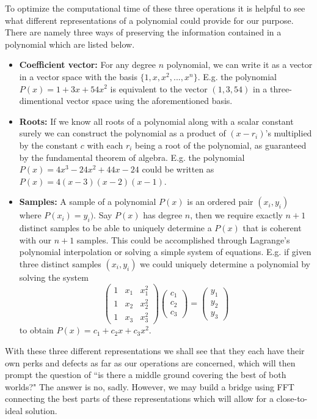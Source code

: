 \documentclass[12pt]{article}
\begin{document}
To optimize the computational time of these three operations it is helpful to see what different representations of a polynomial could provide for our purpose. There are namely three ways of preserving the information contained in a polynomial which are listed below.

\begin{itemize}
\item{\textbf{Coefficient vector:}} For any degree $n$ polynomial, we can write it as a vector in a vector space with the basis $\{1, x, x^2, ..., x^n\}$. E.g. the polynomial $P(x) = 1+3x+54x^2$ is equivalent to the vector $(1,3,54)$ in a three-dimentional vector space using the aforementioned basis.
\item{\textbf{Roots:}} If we know all roots of a polynomial along with a scalar constant surely we can construct the polynomial as a product of $(x-r_i)$'s multiplied by the constant $c$ with each $r_i$ being a root of the polynomial, as guaranteed by the fundamental theorem of algebra. E.g. the polynomial $P(x) = 4x^3-24x^2+44x-24$ could be written as $P(x) = 4(x-3)(x-2)(x-1)$.
\item{\textbf{Samples:}} A sample of a polynomial $P(x)$ is an ordered pair $(x_i,y_i)$ where $P(x_i) = y_i)$. Say $P(x)$ has degree $n$, then we require exactly $n+1$ distinct samples to be able to uniquely determine a $P(x)$ that is coherent with our $n+1$ samples. This could be accomplished through Lagrange's polynomial interpolation or solving a simple system of equations. E.g. if given three distinct samples $(x_i,y_i)$ we could uniquely determine a polynomial by solving the system
\begin{equation*}
\begin{pmatrix}
1 & x_1 & x_1^2\\ 
1 & x_2 & x_2^2\\ 
1 & x_3 & x_3^2
\end{pmatrix}
\begin{pmatrix}
c_1\\ 
c_2\\ 
c_3
\end{pmatrix}
=
\begin{pmatrix}
y_1\\ 
y_2\\ 
y_3
\end{pmatrix}
\end{equation*}
to obtain $P(x) = c_1+c_2x+c_3x^2$.
\end{itemize}
With these three different representations we shall see that they each have their own perks and defects as far as our operations are concerned, which will then prompt the question of ``is there a middle ground covering the best of both worlds?" The answer is no, sadly. However, we may build a bridge using FFT connecting the best parts of these representations which will allow for a close-to-ideal solution.
\end{document}
